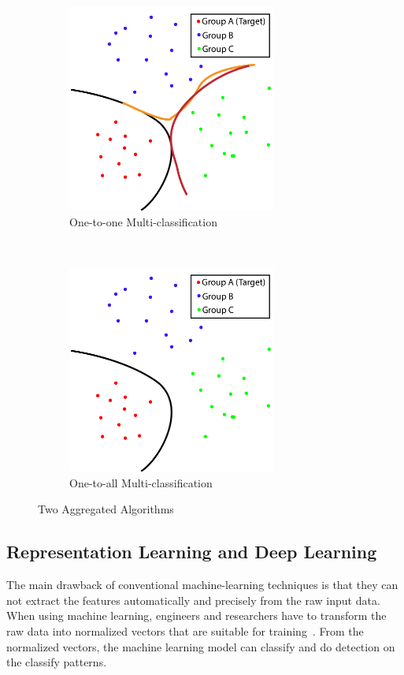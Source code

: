 \begin{spacing}{1.5}
\begin{figure}[th]
    \centering
    \begin{subfigure}[b]{0.49\textwidth}
        \centering
        \includegraphics[width=2.7in, fbox]{Chapter2/1to1.pdf}
        \caption{One-to-one Multi-classification}
        \label{fig:121} 
    \end{subfigure}%
    ~
    \begin{subfigure}[b]{0.49\textwidth}
        \centering
        \includegraphics[width=2.7in, fbox]{Chapter2/1toall.pdf}
        \caption{One-to-all Multi-classification}
        \label{fig:12all} 
    \end{subfigure}
    \caption{Two Aggregated Algorithms}
\end{figure}


\subsection{Representation Learning and Deep Learning}

The main drawback of conventional machine-learning techniques is that they can not extract the features automatically and precisely from the raw input data. When using machine learning, engineers and researchers have to transform the raw data into normalized vectors that are suitable for training~\cite{ongsulee2017artificial}. From the normalized vectors, the machine learning model can classify and do detection on the classify patterns.


\end{spacing}
